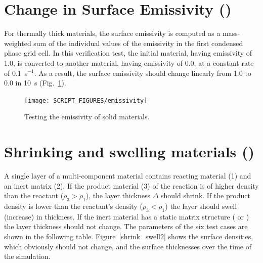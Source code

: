 \documentclass[11pt]{book}
\begin{document}
\section{Change in Surface Emissivity (\texorpdfstring{}{emissivity})}

For thermally thick materials, the surface emissivity is computed as a mass-weighted sum of the individual values of the emissivity in the first condensed phase grid cell. In this verification test, the initial material, having emissivity of 1.0, is converted to another material, having emissivity of 0.0, at a constant rate of 0.1~s$^{-1}$. As a result, the surface emissivity should change linearly from 1.0 to 0.0 in 10~s (Fig.~\ref{emissivity}).

\begin{figure}[!htb]
\centering
\texttt{[image: SCRIPT\_FIGURES/emissivity]}
\caption[The  test case]{Testing the emissivity of solid materials.}
\label{emissivity}
\end{figure}




\section{Shrinking and swelling materials (\texorpdfstring{}{shrink\_swell})}
\label{shrink_swell}

A single layer of a multi-component material contains reacting material (1) and an inert matrix (2). If the product material (3) of the reaction is of higher density than the reactant ($\rho_3 > \rho_1$), the layer thickness $\Delta$ should shrink. If the product density is lower than the reactant's density ($\rho_3 < \rho_1$) the layer should swell (increase) in thickness. If the inert material has a static matrix structure ( or ) the layer thickness should not change. The parameters of the six test cases are shown in the following table. Figure~\ref{shrink_swell2} shows the surface densities, which obviously should not change, and the surface thicknesses over the time of the simulation.
\end{document}
